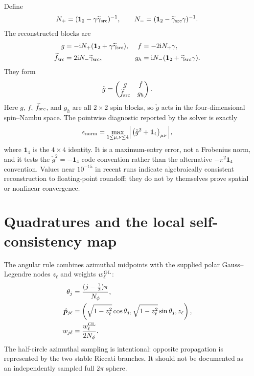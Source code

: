 \documentclass[11pt,a4paper]{article}
\newcommand{\ii}{\mathrm{i}}
\newcommand{\oneSpin}{\mathbf{1}_{2}}
\newcommand{\oneNambu}{\mathbf{1}_{4}}
\newcommand{\phat}{\hat{\bm p}}
\begin{document}
Define
\begin{equation}
  N_+=(\oneSpin-\gamma\widetilde\gamma_{\rm src})^{-1},\qquad
  N_-=(\oneSpin-\widetilde\gamma_{\rm src}\gamma)^{-1}.
\end{equation}
The reconstructed blocks are
\begin{align}
  g&=-\ii N_+(\oneSpin+\gamma\widetilde\gamma_{\rm src}),
  & f&=-2\ii N_+\gamma,\nonumber\\
  \widetilde f_{\rm src}&=2\ii N_-\widetilde\gamma_{\rm src},
  & g_h&=\ii N_-(\oneSpin+\widetilde\gamma_{\rm src}\gamma).
  \label{eq:reconstruction}
\end{align}
They form
\begin{equation}
  \check g=\begin{pmatrix}g&f\\\widetilde f_{\rm src}&g_h\end{pmatrix}.
\end{equation}
Here $g$, $f$, $\widetilde f_{\rm src}$, and $g_h$ are all $2\times2$ spin
blocks, so $\check g$ acts in the four-dimensional spin--Nambu space.  The
pointwise diagnostic reported by the solver is exactly
\begin{equation}
  \epsilon_{\rm norm}
   =\max_{1\leq\mu,\nu\leq4}
      \left|\left(\check g^2+\oneNambu\right)_{\mu\nu}\right|,
  \label{eq:normerror}
\end{equation}
where $\oneNambu$ is the $4\times4$ identity.
It is a maximum-entry error, not a Frobenius norm, and it tests the
$\check g^2=-\oneNambu$ code convention rather than the alternative
$-\pi^2\oneNambu$ convention.  Values near $10^{-15}$ in recent runs indicate
algebraically consistent reconstruction to floating-point roundoff; they do
not by themselves prove spatial or nonlinear convergence.

\section{Quadratures and the local self-consistency map}

The angular rule combines azimuthal midpoints with the supplied polar
Gauss--Legendre nodes $z_\ell$ and weights $w_\ell^{\rm GL}$:
\begin{align}
  \theta_j&=\frac{(j-\tfrac12)\pi}{N_\phi},\\
  \phat_{j\ell}&=
  \left(\sqrt{1-z_\ell^2}\cos\theta_j,
        \sqrt{1-z_\ell^2}\sin\theta_j,z_\ell\right),\\
  w_{j\ell}&=\frac{w_\ell^{\rm GL}}{2N_\phi}.
  \label{eq:angular-rule}
\end{align}
The half-circle azimuthal sampling is intentional: opposite propagation is
represented by the two stable Riccati branches.  It should not be documented
as an independently sampled full $2\pi$ sphere.
\end{document}
